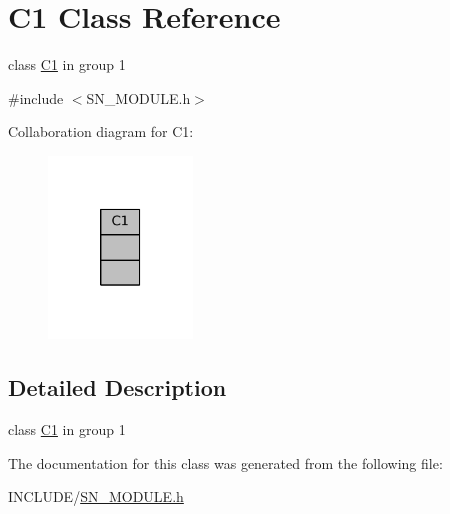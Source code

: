 \hypertarget{classC1}{}\section{C1 Class Reference}
\label{classC1}


class \hyperlink{classC1}{C1} in group 1  




{\ttfamily \#include $<$S\+N\+\_\+\+M\+O\+D\+U\+L\+E.\+h$>$}



Collaboration diagram for C1\+:
\nopagebreak
\begin{figure}[H]
\begin{center}
\leavevmode
\includegraphics[width=109pt]{classC1__coll__graph}
\end{center}
\end{figure}


\subsection{Detailed Description}
class \hyperlink{classC1}{C1} in group 1 

The documentation for this class was generated from the following file\+:\begin{DoxyCompactItemize}
\item 
I\+N\+C\+L\+U\+D\+E/\hyperlink{SN__MODULE_8h}{S\+N\+\_\+\+M\+O\+D\+U\+L\+E.\+h}\end{DoxyCompactItemize}
